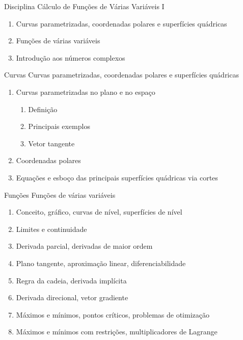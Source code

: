 \begin{frame}{Disciplina}
  Cálculo de Funções de Várias Variáveis I
  \begin{enumerate}[<+->]
    \item Curvas parametrizadas, coordenadas polares e superfícies quádricas
    \item Funções de várias variáveis
    \item Introdução aos números complexos
  \end{enumerate}
\end{frame}

\begin{frame}{Curvas}
  Curvas parametrizadas, coordenadas polares e superfícies quádricas
  \begin{enumerate}[<+->]
    \item Curvas parametrizadas no plano e no espaço
    \begin{enumerate}
      \item Definição
      \item Principais exemplos
      \item Vetor tangente
    \end{enumerate}
    \item Coordenadas polares
    \item Equações e esboço das principais superfícies quádricas via cortes
  \end{enumerate}
\end{frame}

\begin{frame}{Funções}
  Funções de várias variáveis
  \begin{enumerate}[<+->]
    \item Conceito, gráfico, curvas de nível, superfícies de nível
    \item Limites e continuidade
    \item Derivada parcial, derivadas de maior ordem
    \item Plano tangente, aproximação linear, diferenciabilidade
    \item Regra da cadeia, derivada implícita
    \item Derivada direcional, vetor gradiente
    \item Máximos e mínimos, pontos críticos, problemas de otimização
    \item Máximos e mínimos com restrições, multiplicadores de Lagrange
  \end{enumerate}
\end{frame}

